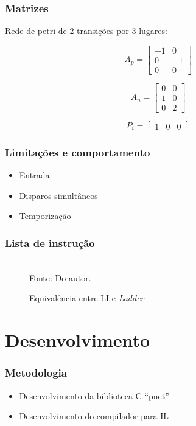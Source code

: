 \documentclass{beamer}
\newcommand{\incsvg}[2]{%
	\def\svgwidth{\columnwidth}
	\graphicspath{{#1}}
	
}
\begin{document}
\begin{frame}
\frametitle{Matrizes}

	Rede de petri de 2 transições por 3 lugares:

	$$ A_p =
	\begin{bmatrix}
		-1 & 0\\
		0 & -1\\
		0 & 0
	\end{bmatrix}
	$$

	$$ A_n =
	\begin{bmatrix}
		0 & 0\\
		1 & 0\\
		0 & 2
	\end{bmatrix}
	$$

	$$
	P_i = 
	\begin{bmatrix}
		1 & 0 & 0
	\end{bmatrix}
	$$

	
\end{frame}

\begin{frame}
\frametitle{Limitações e comportamento}

	\begin{itemize}
		\item Entrada
		\item Disparos simultâneos
		\item Temporização
	\end{itemize}
\end{frame}

\begin{frame}
\frametitle{Lista de instrução}
	\footnotesize
	\begin{figure}[ht]
		\centering
		\caption{Equivalência entre LI e \textit{Ladder}}
		\incsvg{images}{images/illadder}\\
		\label{fig:illadder}
		\footnotesize{Fonte: Do autor.}
	\end{figure}
\end{frame}

\section{Desenvolvimento}

\begin{frame}
\frametitle{Metodologia}
\begin{itemize}
	\item Desenvolvimento da biblioteca C ``pnet''
	\item Desenvolvimento do compilador para IL
\end{itemize}
\end{frame}
\end{document}
